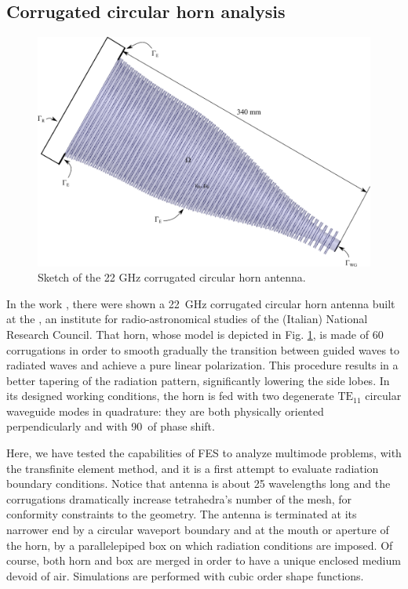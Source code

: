 \subsection{Corrugated circular horn analysis} \label{sec:Horn}

\begin{figure}[ht!]
\centering
\includegraphics[width=13.4cm]{CircHornSketch}
\caption{Sketch of the 22 GHz corrugated circular horn antenna.}
\label{fig:CircHornSketch}
\end{figure}

In the work \cite{lucci2005corrugated}, there were shown a 22~GHz corrugated circular horn antenna built at the , an institute for radio-astronomical studies of the (Italian) National Research Council. That horn,  whose model is depicted in Fig. \ref{fig:CircHornSketch}, is made of 60 corrugations in order to smooth gradually the transition between guided waves to radiated waves and achieve a pure linear polarization. This procedure results in a better tapering of the radiation pattern, significantly lowering the side lobes. In its designed working conditions, the horn is fed with two degenerate $\mathrm{TE}_{11}$ circular waveguide modes in quadrature: they are both physically oriented perpendicularly and with 90\textdegree~of phase shift.

Here, we have tested the capabilities of FES to analyze multimode problems, with the transfinite element method, and it is a first attempt to evaluate radiation boundary conditions. Notice that antenna is about 25 wavelengths long and the corrugations dramatically increase tetrahedra's number of the mesh, for conformity constraints to the geometry.  The antenna is terminated at its narrower end by a circular waveport boundary and at the mouth or aperture of the horn, by a parallelepiped box on which radiation conditions are imposed. Of course, both horn and box are merged in order to have a unique enclosed medium devoid of air. Simulations are performed with cubic order shape functions.

